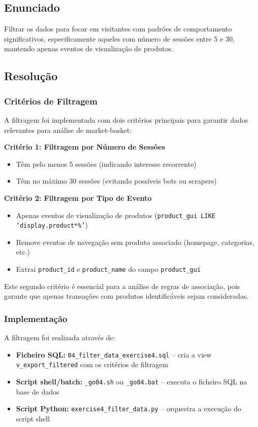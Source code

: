 \documentclass[11pt,a4paper]{article}
\begin{document}
\subsection{Enunciado}

Filtrar os dados para focar em visitantes com padrões de comportamento significativos, especificamente aqueles com número de sessões entre 5 e 30, mantendo apenas eventos de visualização de produtos.

\subsection{Resolução}

\subsubsection{Critérios de Filtragem}

A filtragem foi implementada com dois critérios principais para garantir dados relevantes para análise de market-basket:

\textbf{Critério 1: Filtragem por Número de Sessões}
\begin{itemize}
    \item Têm pelo menos 5 sessões (indicando interesse recorrente)
    \item Têm no máximo 30 sessões (evitando possíveis bots ou scrapers)
\end{itemize}

\textbf{Critério 2: Filtragem por Tipo de Evento}
\begin{itemize}
    \item Apenas eventos de visualização de produtos (\texttt{product\_gui LIKE 'display.product*\%'})
    \item Remove eventos de navegação sem produto associado (homepage, categorias, etc.)
    \item Extrai \texttt{product\_id} e \texttt{product\_name} do campo \texttt{product\_gui}
\end{itemize}

Este segundo critério é essencial para a análise de regras de associação, pois garante que apenas transações com produtos identificáveis sejam consideradas.

\subsubsection{Implementação}

A filtragem foi realizada através de:
\begin{itemize}
    \item \textbf{Ficheiro SQL:} \texttt{04\_filter\_data\_exercise4.sql} -- cria a view \texttt{v\_export\_filtered} com os critérios de filtragem
    \item \textbf{Script shell/batch:} \texttt{\_go04.sh} ou \texttt{\_go04.bat} -- executa o ficheiro SQL na base de dados
    \item \textbf{Script Python:} \texttt{exercise4\_filter\_data.py} -- orquestra a execução do script shell
\end{itemize}
\end{document}
